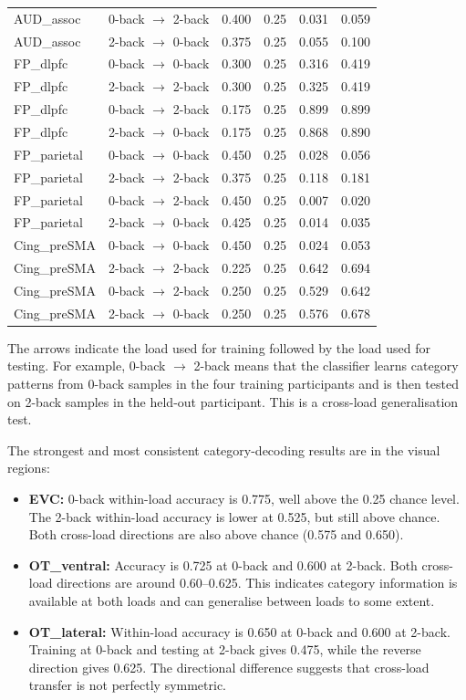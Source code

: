 \documentclass[11pt,a4paper]{article}
\begin{document}
\begin{longtable}{p{}p{}rrrr}
AUD\_assoc & 0-back \(\rightarrow\) 2-back & 0.400 & 0.25 & 0.031 & 0.059\\
AUD\_assoc & 2-back \(\rightarrow\) 0-back & 0.375 & 0.25 & 0.055 & 0.100\\
FP\_dlpfc & 0-back \(\rightarrow\) 0-back & 0.300 & 0.25 & 0.316 & 0.419\\
FP\_dlpfc & 2-back \(\rightarrow\) 2-back & 0.300 & 0.25 & 0.325 & 0.419\\
FP\_dlpfc & 0-back \(\rightarrow\) 2-back & 0.175 & 0.25 & 0.899 & 0.899\\
FP\_dlpfc & 2-back \(\rightarrow\) 0-back & 0.175 & 0.25 & 0.868 & 0.890\\
FP\_parietal & 0-back \(\rightarrow\) 0-back & 0.450 & 0.25 & 0.028 & 0.056\\
FP\_parietal & 2-back \(\rightarrow\) 2-back & 0.375 & 0.25 & 0.118 & 0.181\\
FP\_parietal & 0-back \(\rightarrow\) 2-back & 0.450 & 0.25 & 0.007 & 0.020\\
FP\_parietal & 2-back \(\rightarrow\) 0-back & 0.425 & 0.25 & 0.014 & 0.035\\
Cing\_preSMA & 0-back \(\rightarrow\) 0-back & 0.450 & 0.25 & 0.024 & 0.053\\
Cing\_preSMA & 2-back \(\rightarrow\) 2-back & 0.225 & 0.25 & 0.642 & 0.694\\
Cing\_preSMA & 0-back \(\rightarrow\) 2-back & 0.250 & 0.25 & 0.529 & 0.642\\
Cing\_preSMA & 2-back \(\rightarrow\) 0-back & 0.250 & 0.25 & 0.576 & 0.678\\
\bottomrule
\end{longtable}

The arrows indicate the load used for training followed by the load used for testing. For example, 0-back \(\rightarrow\) 2-back means that the classifier learns category patterns from 0-back samples in the four training participants and is then tested on 2-back samples in the held-out participant. This is a cross-load generalisation test.

The strongest and most consistent category-decoding results are in the visual regions:
\begin{itemize}
    \item \textbf{EVC:} 0-back within-load accuracy is 0.775, well above the 0.25 chance level. The 2-back within-load accuracy is lower at 0.525, but still above chance. Both cross-load directions are also above chance (0.575 and 0.650).
    \item \textbf{OT\_ventral:} Accuracy is 0.725 at 0-back and 0.600 at 2-back. Both cross-load directions are around 0.60--0.625. This indicates category information is available at both loads and can generalise between loads to some extent.
    \item \textbf{OT\_lateral:} Within-load accuracy is 0.650 at 0-back and 0.600 at 2-back. Training at 0-back and testing at 2-back gives 0.475, while the reverse direction gives 0.625. The directional difference suggests that cross-load transfer is not perfectly symmetric.
\end{itemize}
\end{document}
